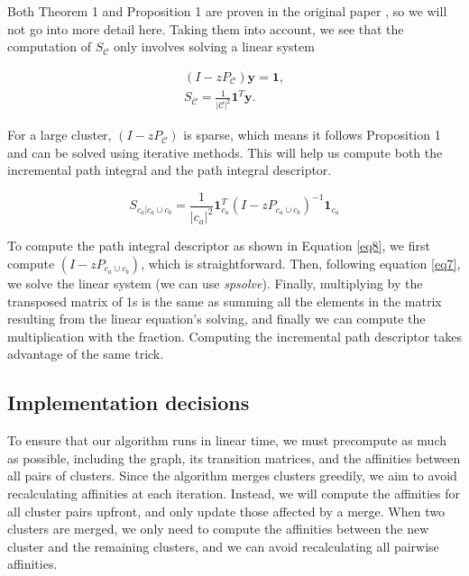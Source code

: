 \documentclass[
	10pt,
	parskip=half-,	
	paper=a4,
	english
	]{scrartcl}
\begin{document}
Both Theorem 1 and Proposition 1 are proven in the original paper \cite{citation1}, so we will not go into more detail here. Taking them into account, we see that the computation of $S_{\mathcal{C}}$ only involves solving a linear system

\begin{equation}
    \begin{split}
    (I - zP_{\mathcal{C}}) \mathbf{y} = \mathbf{1},
    \label{eq7}
    \\
    S_{\mathcal{C}} = \frac{1}{|\mathcal{C}|^2} \mathbf{1}^{T} \mathbf{y}.
    \end{split}
\end{equation}

For a large cluster, $(I - zP_{\mathcal{C}})$ is sparse, which means it follows Proposition 1 and can be solved using iterative methods. This will help us compute both the incremental path integral and the path integral descriptor.

\begin{equation}
    S_{c_a|c_a \cup c_b} = \frac{1}{|c_a|^2} \mathbf{1}_{c_a}^{T} (I - zP_{c_a \cup c_b})^{-1} \mathbf{1}_{c_a}
\end{equation}

To compute the path integral descriptor as shown in Equation \ref{eq8}, we first compute \((I - zP_{c_a \cup c_b})\), which is straightforward. Then, following equation \ref{eq7}, we solve the linear system (we can use \textit{spsolve}). Finally, multiplying by the transposed matrix of 1s is the same as summing all the elements in the matrix resulting from the linear equation's solving, and finally we can compute the multiplication with the fraction. Computing the incremental path descriptor takes advantage of the same trick. 

\subsection{Implementation decisions}

To ensure that our algorithm runs in linear time, we must precompute as much as possible, including the graph, its transition matrices, and the affinities between all pairs of clusters. Since the algorithm merges clusters greedily, we aim to avoid recalculating affinities at each iteration. Instead, we will compute the affinities for all cluster pairs upfront, and only update those affected by a merge. When two clusters are merged, we only need to compute the affinities between the new cluster and the remaining clusters, and we can avoid recalculating all pairwise affinities.
\end{document}
